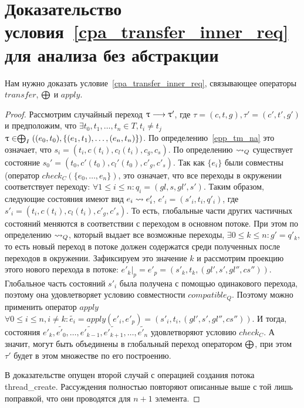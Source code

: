 \section{Доказательство условия~\ref{cpa_transfer_inner_req} для анализа без абстракции}
\label{sect_transfer_q_proof}

Нам нужно доказать условие~\ref{cpa_transfer_inner_req}, связывающее операторы $transfer$, $\mathrel{\bigoplus}$ и $apply$.
\begin{proof}

Рассмотрим случайный переход $\uptau \longrightarrow \uptau'$, где $\tau=(c,t,g), \tau' = (c',t',g')$ и предположим, что 
$\exists t_0, t_1, \dots, t_n \in T, t_i \neq t_j$ \\
$\uptau \in \mathrel{\bigoplus}_I((e_0,t_0), \{(e_1,t_1), \dots, (e_n, t_n)\})$.
По определению~\ref{epp_tm_na} это означает, что $s_i = (t_i, c(t_i),c_l(t_i), c_g,c_s)$. 
По определению $\leadsto_Q$ существует состояние $s_0' = (t_0, c'(t_0),c_l'(t_0), c'_g,c'_s)$.
Так как $\{e_i\}$ были совместны  (оператор $check_C(\{e_0,\dots,e_n\})$, это означает, что все переходы в окружении соответствует переходу: $\forall 1 \le i \le n: q_i = (gl, s, gl', s')$.
Таким образом, следующие состояния имеют вид $e_i \leadsto e'_i$, $e'_i = (s'_i, t_i, q'_i)$, где $s'_i = (t_i, c(t_i),c_l(t_i), c'_g,c'_s)$.
То есть, глобальные части других частичных состояний меняются в соответствии с переходом в основном потоке.
При этом по определению $\leadsto_Q$, который выдает все возможные переходы, $\exists 0 \le k \le n: g' = q'_k$, то есть новый переход в потоке должен содержатся среди полученных после переходов в окружении. 
Зафиксируем это значение $k$ и рассмотрим проекцию этого нового перехода в потоке: $e'_k|_p = e'_p = (s'_k, t_k, (gl', s', gl'', cs'')) $.
Глобальное часть состояний $s'_i$ была получена с помощью одинакового перехода, поэтому она удовлетворяет условию совместности $compatible_Q$. 
Поэтому можно применить оператор $apply$ $\forall 0 \le i \le n, i \neq k: \tilde{e_i} = apply(e'_i, e'_p) = (s'_i, t_i, (gl', s', gl'', cs''))$.
И тогда, состояния $e'_k, \tilde{e'_0}, \dots, \tilde{e'_{k-1}}, \tilde{e'_{k+1}}, \dots, \tilde{e'_n}$ удовлетворяют условию $check_C$. 
А значит, могут быть объединены в глобальный переход оператором $\mathrel{\bigoplus}$, при этом $\tau'$ будет в этом множестве по его построению.

В доказательстве опущен второй случай с операцией создания потока thread\_create. 
Рассуждения полностью повторяют описанные выше с той лишь поправкой, что они проводятся для $n+1$ элемента.
\end{proof}

